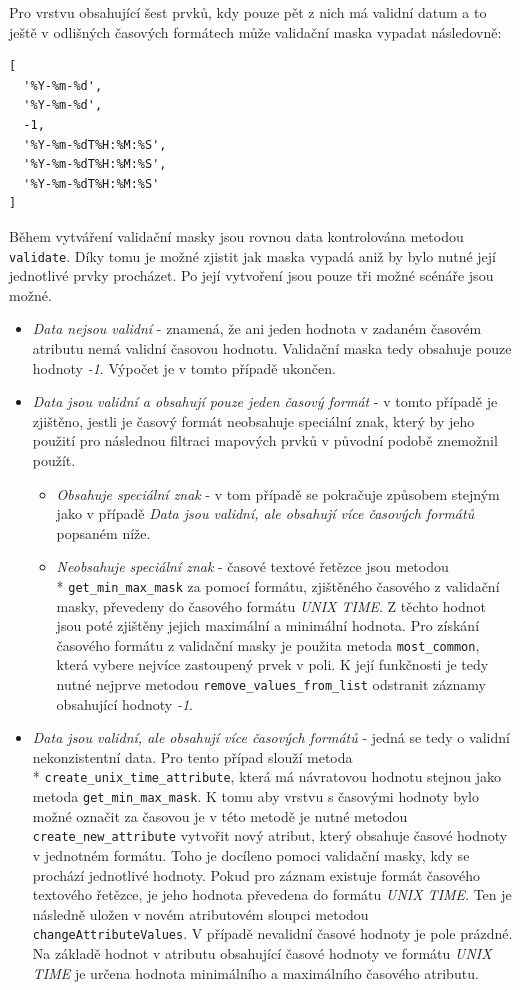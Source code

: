 Pro vrstvu obsahující šest prvků, kdy pouze pět z nich má validní datum a to ještě v odlišných časových formátech může validační maska vypadat následovně:

\begin{verbatim}
[
  '%Y-%m-%d',
  '%Y-%m-%d',
  -1,
  '%Y-%m-%dT%H:%M:%S',
  '%Y-%m-%dT%H:%M:%S',
  '%Y-%m-%dT%H:%M:%S'
]
\end{verbatim}

Během vytváření validační masky jsou rovnou data kontrolována metodou \verb|validate|. Díky tomu je možné zjistit jak maska vypadá aniž by bylo nutné její jednotlivé prvky procházet. Po její vytvoření jsou pouze tři možné scénáře jsou možné.


\begin{itemize}
	\item\textit{Data nejsou validní} - znamená, že ani jeden hodnota v zadaném časovém atributu nemá validní časovou hodnotu. Validační maska tedy obsahuje pouze hodnoty \textit{-1}. Výpočet je v tomto případě ukončen.
	\item\textit{Data jsou validní a obsahují pouze jeden časový formát} - v tomto případě je zjištěno, jestli je časový formát neobsahuje speciální znak, který by jeho použití pro následnou filtraci mapových prvků v původní podobě znemožnil použít.
	\begin{itemize}
		\item\textit{Obsahuje speciální znak} - v tom případě se pokračuje způsobem stejným jako v případě \textit{Data jsou validní, ale obsahují více časových formátů} popsaném níže.
		\item\textit{Neobsahuje speciální znak} - časové textové řetězce jsou metodou \\* \verb|get_min_max_mask| za pomocí formátu, zjištěného časového z validační masky, převedeny do časového formátu \textit{UNIX TIME}. Z těchto hodnot jsou poté zjištěny jejich maximální a minimální hodnota.
		Pro získání časového formátu z validační masky je použita metoda \verb|most_common|, která vybere nejvíce zastoupený prvek v poli. K její funkčnosti je tedy nutné nejprve metodou \verb|remove_values_from_list| odstranit záznamy obsahující hodnoty \textit{-1}.
	\end{itemize}
	\item\textit{Data jsou validní, ale obsahují více časových formátů} - jedná se tedy o validní nekonzistentní data. Pro tento případ slouží metoda \\* \verb|create_unix_time_attribute|, která má návratovou hodnotu stejnou jako metoda \verb|get_min_max_mask|. K tomu aby vrstvu s časovými hodnoty bylo možné označit za časovou je v této metodě je nutné metodou \verb|create_new_attribute| vytvořit nový atribut, který obsahuje časové hodnoty v jednotném formátu. Toho je docíleno pomoci validační masky, kdy se prochází jednotlivé hodnoty. Pokud pro záznam existuje formát časového textového řetězce, je jeho hodnota převedena do formátu \textit{UNIX TIME}. Ten je následně uložen v novém atributovém sloupci metodou \verb|changeAttributeValues|. V případě nevalidní časové hodnoty je pole prázdné. Na základě hodnot v atributu obsahující časové hodnoty ve formátu \textit{UNIX TIME} je určena hodnota minimálního a maximálního časového atributu.

\end{itemize}
